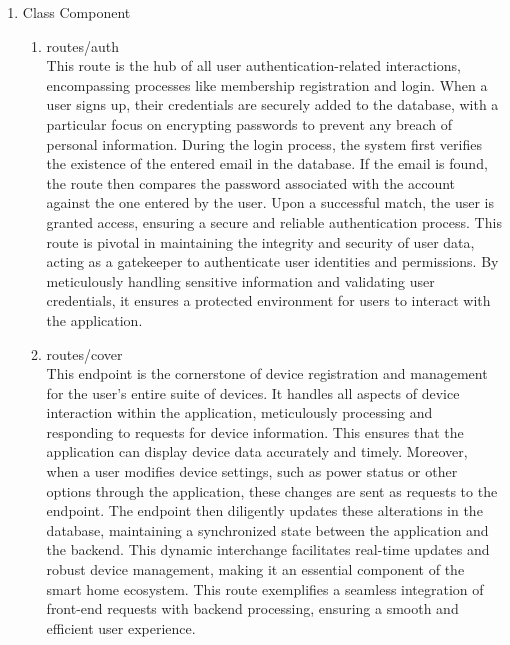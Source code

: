 \documentclass[conference]{IEEEtran}
\begin{document}
\begin{enumerate}[label=\arabic*.]
\item Class Component\\
\begin{enumerate}[label=\alph*.]
\item routes/auth \\
This route is the hub of all user authentication-related interactions, encompassing processes like membership registration and login. When a user signs up, their credentials are securely added to the database, with a particular focus on encrypting passwords to prevent any breach of personal information. During the login process, the system first verifies the existence of the entered email in the database. If the email is found, the route then compares the password associated with the account against the one entered by the user. Upon a successful match, the user is granted access, ensuring a secure and reliable authentication process. This route is pivotal in maintaining the integrity and security of user data, acting as a gatekeeper to authenticate user identities and permissions. By meticulously handling sensitive information and validating user credentials, it ensures a protected environment for users to interact with the application.\\
\item routes/cover\\
This endpoint is the cornerstone of device registration and management for the user's entire suite of devices. It handles all aspects of device interaction within the application, meticulously processing and responding to requests for device information. This ensures that the application can display device data accurately and timely. Moreover, when a user modifies device settings, such as power status or other options through the application, these changes are sent as requests to the endpoint. The endpoint then diligently updates these alterations in the database, maintaining a synchronized state between the application and the backend. This dynamic interchange facilitates real-time updates and robust device management, making it an essential component of the smart home ecosystem. This route exemplifies a seamless integration of front-end requests with backend processing, ensuring a smooth and efficient user experience.\\
\end{enumerate}
\end{enumerate} %
\end{document}
